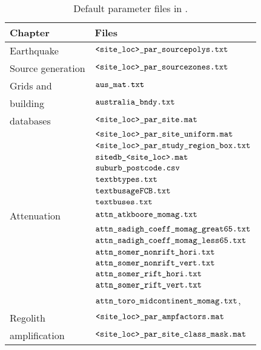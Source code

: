 \begin{table}
\caption{Default parameter files in
.}
\label{tab:app-inputfiles} \vspace{0.8em}
\begin{tabular}{|l|p{}|}
\hline
Chapter & Files \\
\hline Earthquake & $\typeparfile{<site\_loc>}{\_par}{\_sourcepolys}{.txt}$ \\
Source generation &  $\typeparfile{<site\_loc>}{\_par}{\_sourcezones}{.txt}$ \\
\hline
Grids and & $\typeparfile{au}{s}{\_mat}{.txt}$\\
building & $\typeparfile{aust}{ralia}{\_bndy}{.txt}$\\
databases & $\typeparfile{<site\_loc>}{\_par}{\_site}{.mat}$\\
 &  $\typeparfile{<site\_loc>}{\_par\_site}{\_uniform}{.mat}$ \\
 &  $\typeparfile{<site\_loc>}{\_par\_study}{\_region\_box}{.txt}$ \\
  & $\typeparfile{sitedb}{\_<site}{\_loc>}{.mat}$ \\
 & $\typeparfile{suburb}{\_post}{code}{.csv}$\\
  & $\typeparfile{text}{b}{types}{.txt}$ \\
 & $\typeparfile{text}{busage}{FCB}{.txt}$ \\
 &  $\typeparfile{text}{b}{uses}{.txt}$ \\
\hline
Attenuation & $\typeparfile{attn}{\_atkboore}{\_momag}{.txt}$\\
 &  $\typeparfile{attn\_sadigh}{\_coeff\_momag}{\_great65}{.txt}$ \\
 &  $\typeparfile{attn\_sadigh}{\_coeff\_momag}{\_less65}{.txt}$ \\
 &  $\typeparfile{attn\_somer}{\_nonrift}{\_hori}{.txt}$ \\
 &  $\typeparfile{attn\_somer}{\_nonrift}{\_vert}{.txt}$ \\
 &  $\typeparfile{attn\_somer}{\_rift}{\_hori}{.txt}$ \\
 &  $\typeparfile{attn\_somer}{\_rift}{\_vert}{.txt}$ \\
 & $\typeparfile{attn\_toro}{\_midcontinent}{\_momag}{.txt}$,              \\
\hline
Regolith &  $\typeparfile{<site\_loc>}{\_par}{\_ampfactors}{.mat}$\\
amplification &  $\typeparfile{<site\_loc>\_par}{\_site\_class}{\_mask}{.mat}$ \\

\end{tabular}
\end{table}
